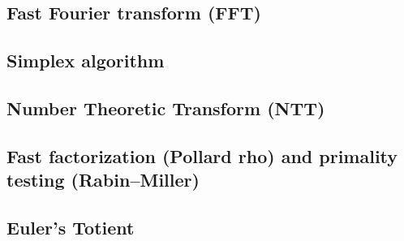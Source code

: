 \documentclass[9pt]{extarticle}
\begin{document}
\begin{multicols*}{3}
\subsection{Fast Fourier transform (FFT)} %


\subsection{Simplex algorithm} %


\subsection{Number Theoretic Transform (NTT)}


\subsection{Fast factorization (Pollard rho) and primality testing
(Rabin--Miller)} %


\subsection{Euler's Totient} %



\end{multicols*}
\end{document}
